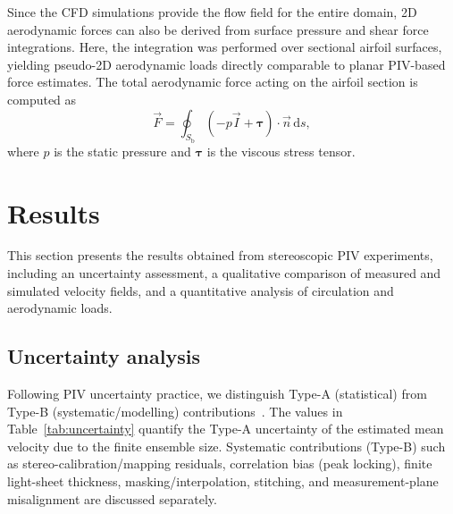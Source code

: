 \documentclass[wes, manuscript]{copernicus}
\begin{document}
Since the CFD simulations provide the flow field for the entire domain, 2D aerodynamic forces can also be derived from surface pressure and shear force integrations. 
Here, the integration was performed over sectional airfoil surfaces, yielding pseudo-2D aerodynamic loads directly comparable to planar PIV-based force estimates.
The total aerodynamic force acting on the airfoil section is computed as
\begin{equation}
    \vec{F} = \oint_{S_{\mathrm{b}}} \left( - p \vec{I} + \boldsymbol{\tau} \right)\cdot \vec{n}\,\mathrm{d}s,
\end{equation}
where $p$ is the static pressure and $\boldsymbol{\tau}$ is the viscous stress tensor.
%
\section{Results}\label{sec:results}
%
This section presents the results obtained from stereoscopic PIV experiments, including an uncertainty assessment, a qualitative comparison of measured and simulated velocity fields, and a quantitative analysis of circulation and aerodynamic loads.
%
\subsection{Uncertainty analysis}
%
Following PIV uncertainty practice, we distinguish Type-A (statistical) from Type-B (systematic/modelling) contributions~\citep{sciacchitano2016}. The values in Table~\ref{tab:uncertainty} quantify the Type-A uncertainty of the estimated mean velocity due to the finite ensemble size. 
Systematic contributions (Type-B) such as stereo-calibration/mapping residuals, correlation bias (peak locking), finite light-sheet thickness, masking/interpolation, stitching, and measurement-plane misalignment are discussed separately.
\end{document}
